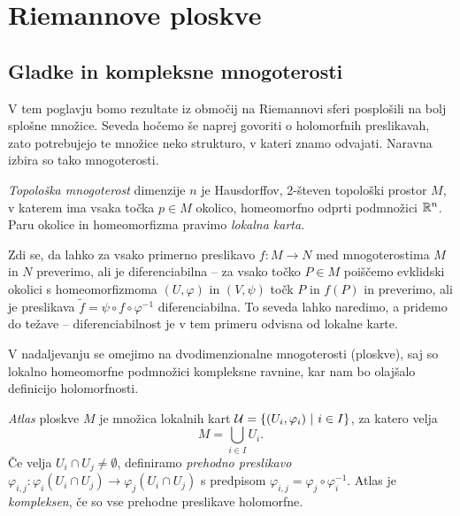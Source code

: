 \section{Riemannove ploskve}

\subsection{Gladke in kompleksne mnogoterosti}

V tem poglavju bomo rezultate iz območij na Riemannovi sferi
posplošili na bolj splošne množice. Seveda hočemo še naprej
govoriti o holomorfnih preslikavah, zato potrebujejo te množice
neko strukturo, v kateri znamo odvajati. Naravna izbira so tako
mnogoterosti.

\begin{definicija}
\emph{Topološka mnogoterost} dimenzije $n$ je Hausdorffov, 2-števen
topološki prostor $M$, v katerem ima vsaka točka $p \in M$ okolico,
homeomorfno odprti podmnožici $\mathbb{R}^n$. Paru okolice in homeomorfizma
pravimo \emph{lokalna karta}.
\end{definicija}

Zdi se, da lahko za vsako primerno preslikavo $f \colon M \to N$
med mnogoterostima $M$ in $N$ preverimo, ali je diferenciabilna --
za vsako točko $P \in M$ poiščemo evklidski okolici s
homeomorfizmoma $(U, \varphi)$ in $(V, \psi)$ točk $P$ in $f(P)$ in
preverimo, ali je preslikava
$\tilde{f} = \psi \circ f \circ \varphi^{-1}$ diferenciabilna. To
seveda lahko naredimo, a pridemo do težave -- diferenciabilnost je
v tem primeru odvisna od lokalne karte.

V nadaljevanju se omejimo na dvodimenzionalne mnogoterosti
(ploskve), saj so lokalno homeomorfne podmnožici kompleksne
ravnine, kar nam bo olajšalo definicijo holomorfnosti.

\begin{definicija}
\emph{Atlas} ploskve $M$ je množica lokalnih kart
$\mathcal{U} = \left\{(U_i, \varphi_i)~\middle\vert~i \in I\right\}$, za katero velja
\[
M = \bigcup_{i \in I} U_i.
\]
Če velja
$U_i \cap U_j \ne \emptyset$, definiramo \emph{prehodno preslikavo}
$\varphi_{i,j} \colon
\varphi_i(U_i \cap U_j) \to \varphi_j(U_i \cap U_j)$ s predpisom
$\varphi_{i,j} = \varphi_j \circ \varphi_i^{-1}$. Atlas je
\emph{kompleksen}, če so vse prehodne preslikave holomorfne.
\end{definicija}

